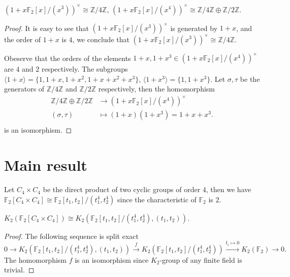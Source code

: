 \begin{lemma} 
\label{lem:BW}
	$(1+x\mathbb{F}_2[x]/(x^{3}))^{\times}\cong \mathbb{Z}/4 \mathbb{Z}$, $(1+x\mathbb{F}_2[x]/(x^{4}))^{\times}\cong \mathbb{Z}/4 \mathbb{Z} \oplus\mathbb{Z}/2 \mathbb{Z}$.
\end{lemma}
\begin{proof}
	It is easy to see that $(1+x\mathbb{F}_2[x]/(x^{3}))^{\times}$ is generated by $1+x$, and the order of $ 1+x $ is $4$, we conclude that $(1+x\mathbb{F}_2[x]/(x^{3}))^{\times}\cong \mathbb{Z}/4 \mathbb{Z}$.

	Obeserve that the orders of the elements $1+x,1+x^3\in (1+x \mathbb{F}_2[x]/(x^4))^{\times}$ are $4$ and $2$ respectively. The subgroups $\langle 1+x \rangle = \{1,1+x,1+x^2,1+x+x^2+x^3\}$, $\langle 1+x^3 \rangle = \{1,1+x^3\}$. Let $\sigma,\tau$ be the generators of $\mathbb{Z}/4 \mathbb{Z}$ and $\mathbb{Z}/2 \mathbb{Z}$ respectively, then the homomorphism 
		\begin{align*}
		\mathbb{Z}/4 \mathbb{Z} \oplus \mathbb{Z}/2 \mathbb{Z} &\longrightarrow (1+x\mathbb{F}_2[x]/(x^{4}))^{\times} \\
		(\sigma,\tau) & \mapsto (1+x)(1+x^3)=1+x+x^3. \\
		\end{align*}
	is an isomorphism.
\end{proof}
\section{Main result}
Let $C_4\times C_4$ be the direct product of two cyclic groups of order $4$, then we have $\mathbb{F}_2[C_4\times C_4]  \cong \mathbb{F}_2[t_1,t_2]/(t_1^4,t_2^4)$ since the characteristic of $\mathbb{F}_2$ is $2$.
\begin{lemma}
	$K_2(\mathbb{F}_2[C_4\times C_4] ) \cong K_2(\mathbb{F}_2[t_1,t_2]/(t_1^4,t_2^4),(t_1,t_2))$.
\end{lemma}
\begin{proof}
	The following sequence is split exact
	\[
	0\longrightarrow K_2(\mathbb{F}_2[t_1,t_2]/(t_1^4,t_2^4),(t_1,t_2)) \overset{f}\longrightarrow K_2(\mathbb{F}_2[t_1,t_2]/(t_1^4,t_2^4)) \overset{t_i\mapsto 0}\longrightarrow K_2(\mathbb{F}_2) \longrightarrow 0.
	\]
	The homomorphism $f$ is an isomorphism since $K_2$-group of any finite field is trivial.
\end{proof}

